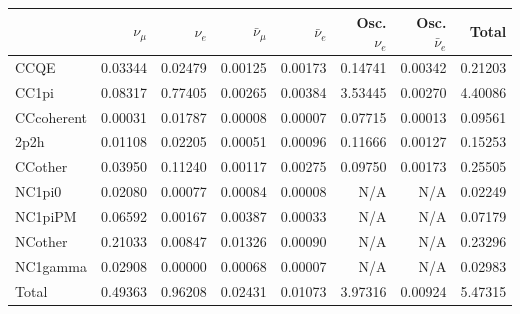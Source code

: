\begin{tabular} { | l ||r | r | r | r | r | r | | r | }
\hline
              & $\nu_\mu$            & $\nu_e$              & $\bar{\nu}_{\mu}$    & $\bar{\nu}_{e}$      & Osc. $\nu_e$         & Osc. $\bar{\nu}_{e}$ & Total                \\ \hline\hline
 CCQE         & 0.03344              & 0.02479              & 0.00125              & 0.00173              & 0.14741              & 0.00342              & 0.21203              \\ \hline
 CC1pi        & 0.08317              & 0.77405              & 0.00265              & 0.00384              & 3.53445              & 0.00270              & 4.40086              \\ \hline
 CCcoherent   & 0.00031              & 0.01787              & 0.00008              & 0.00007              & 0.07715              & 0.00013              & 0.09561              \\ \hline
 2p2h         & 0.01108              & 0.02205              & 0.00051              & 0.00096              & 0.11666              & 0.00127              & 0.15253              \\ \hline
 CCother      & 0.03950              & 0.11240              & 0.00117              & 0.00275              & 0.09750              & 0.00173              & 0.25505              \\ \hline
 NC1pi0       & 0.02080              & 0.00077              & 0.00084              & 0.00008              & N/A                  & N/A                  & 0.02249              \\ \hline
 NC1piPM      & 0.06592              & 0.00167              & 0.00387              & 0.00033              & N/A                  & N/A                  & 0.07179              \\ \hline
 NCother      & 0.21033              & 0.00847              & 0.01326              & 0.00090              & N/A                  & N/A                  & 0.23296              \\ \hline
 NC1gamma     & 0.02908              & 0.00000              & 0.00068              & 0.00007              & N/A                  & N/A                  & 0.02983              \\ \hline
\hline
 Total        & 0.49363              & 0.96208              & 0.02431              & 0.01073              & 3.97316              & 0.00924              & 5.47315              \\ \hline

\end{tabular}
